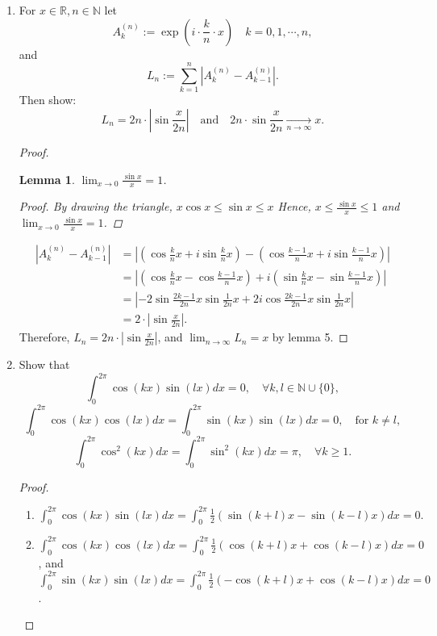 \documentclass{article}
\newtheorem{lemma}{Lemma}
\begin{document}
\begin{enumerate}[font = \Large\bfseries\itshape\space, leftmargin = 3mm, labelsep = 3mm]
\item
For $x \in \mathbb{R}, n \in \mathbb{N}$ let
$$A_k^{(n)} := \exp \left(i\cdot \frac{k}{n} \cdot x\right) \quad k = 0,1,\cdots,n,$$
and
$$L_n := \sum_{k=1}^n |A_k^{(n)} - A_{k-1}^{(n)}|.$$
Then show:
$$L_n = 2n \cdot |\sin\frac{x}{2n}| \quad \text{and} \quad 2n\cdot \sin\frac{x}{2n} \xrightarrow[n\rightarrow\infty]{} x.$$
\begin{proof}
\begin{lemma}
$\lim_{x\rightarrow 0}\frac{\sin x}{x} = 1$.
\begin{proof}
By drawing the triangle, $x\cos x \leq \sin x \leq x$
Hence, $x \leq \frac{\sin x}{x} \leq 1$ and $\lim_{x\rightarrow 0} \frac{\sin x}{x} = 1$.
\end{proof}
\end{lemma}
$$
\begin{aligned}
\left|A^{(n)}_k - A^{(n)}_{k-1}\right|
&= \left|\left(\cos \frac{k}{n}x + i\sin \frac{k}{n}x\right) - \left(\cos \frac{k-1}{n}x + i\sin \frac{k-1}{n}x\right)\right|\\
&= \left|\left(\cos \frac{k}{n}x - \cos \frac{k-1}{n}x\right) + i \left(\sin \frac{k}{n}x - \sin \frac{k-1}{n}x\right)\right|\\
&= \left|-2\sin\frac{2k-1}{2n}x\sin\frac{1}{2n}x + 2i\cos\frac{2k-1}{2n}x \sin\frac{1}{2n}x\right|\\
&= 2 \cdot \left|\sin \frac{x}{2n}\right|.
\end{aligned}
$$
Therefore, $L_n = 2n \cdot |\sin \frac{x}{2n}|$, and $\lim_{n\rightarrow \infty} L_n = x$ by lemma 5.
\end{proof}

\item
Show that
$$\int_0^{2\pi} \cos(kx)\sin(lx)dx = 0, \quad \forall k,l \in \mathbb{N} \cup \{0\},$$
$$\int_0^{2\pi} \cos(kx)\cos(lx)dx = \int_0^{2\pi} \sin(kx)\sin(lx)dx = 0, \quad \text{for } k \neq l,$$
$$\int_0^{2\pi} \cos^2(kx)dx = \int_0^{2\pi} \sin^2(kx)dx = \pi, \quad \forall k \geq 1.$$
\begin{proof}
\begin{enumerate}
\item
$\int_0^{2\pi} \cos(kx)\sin(lx)dx
= \int_0^{2\pi} \frac{1}{2} \left( \sin(k+l)x - \sin(k-l)x\right)dx
= 0.$

\item
$\int_0^{2\pi} \cos(kx)\cos(lx)dx
= \int_0^{2\pi} \frac{1}{2}\left(\cos(k+l)x + \cos(k-l)x\right)dx
= 0$, and\\
$\int_0^{2\pi} \sin(kx)\sin(lx)dx
= \int_0^{2\pi} \frac{1}{2}\left(-\cos(k+l)x + \cos(k-l)x\right)dx
= 0$.


\end{enumerate}
\end{proof}
\end{enumerate}
\end{document}
